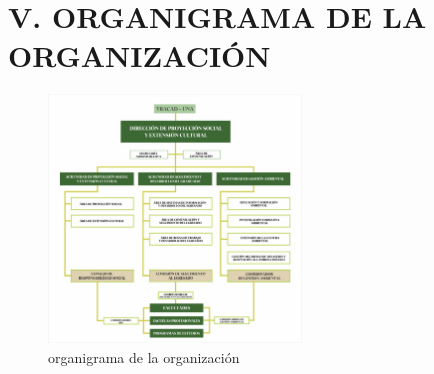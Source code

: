 \documentclass[12pt,a4paper]{article}
\begin{document}
\newpage
\section{V. ORGANIGRAMA DE LA ORGANIZACIÓN}
\begin{figure}[!htb]
    \centering
    \includegraphics[width=0.6\textwidth]{images/organigrama.jpeg}
    \caption{organigrama de la organización}

\end{figure}

\newpage
\end{document}
